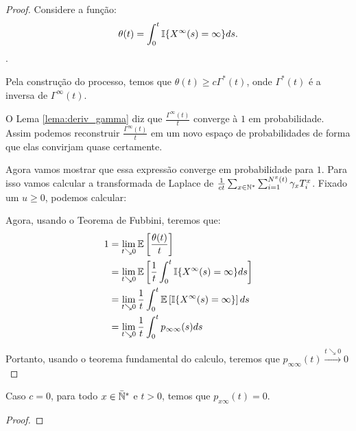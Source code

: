 \begin{proof}
  Considere a função:
  \begin{displaymath}
    \theta(t) = \int_0^t {\mathbb{I}} \{ X^\infty (s) = \infty \} ds.
  \end{displaymath}.
  
  Pela construção do processo, temos que $\theta(t) \geq c
  \Gamma^*(t)$, onde $\Gamma^*(t)$ é a inversa de $\Gamma^\infty(t)$.

  O Lema \ref{lema:deriv_gamma} diz que $\frac{\Gamma^\infty(t)}{t}$
  converge à $1$ em probabilidade. Assim podemos reconstruir
  $\frac{\Gamma^\infty(t)}{t}$ em um novo espaço de probabilidades de
  forma que elas convirjam quase certamente.

  Agora vamos mostrar que essa expressão converge em probabilidade
  para $1$. Para isso vamos calcular a transformada de Laplace de
  $\frac{1}{ct} \sum_{x \in {\mathbb{N^*}}} \sum_{i = 1}^{N^x(t)} \gamma_x
  T^x_i$. Fixado um $u \geq 0$, podemos calcular:






  Agora, usando o Teorema de Fubbini, teremos que:
  \begin{align*}
    1 &= \lim_{t \searrow 0} {\mathbb{E}} \left[ \frac{\theta(t)}{t} \right] \\ 
    &= \lim_{t \searrow 0} {\mathbb{E}}\left[
      \frac{1}{t} \int_0^t {\mathbb{I}}\{ X^\infty(s) = \infty \} ds
    \right] \\
    &= \lim_{t \searrow 0} 
      \frac{1}{t} \int_0^t {\mathbb{E}}\left[ {\mathbb{I}}\{ X^\infty(s) = \infty \}\right] ds
    \\
    &= \lim_{t \searrow 0} \frac{1}{t} \int_0^t p_{\infty \infty} (s) ds
  \end{align*}

  Portanto, usando o teorema fundamental do calculo, teremos que
  $p_{\infty \infty} (t) \xrightarrow{t \searrow 0} 0$


\end{proof}

\begin{proposicao}
  \label{prop:naocontinuidade}
  Caso $c = 0$, para todo $x \in {\mathbb{\bar{N}^*}}$ e $t > 0$, temos que $p_{x
    \infty} (t) = 0$.
\end{proposicao}
\begin{proof}
\end{proof}


